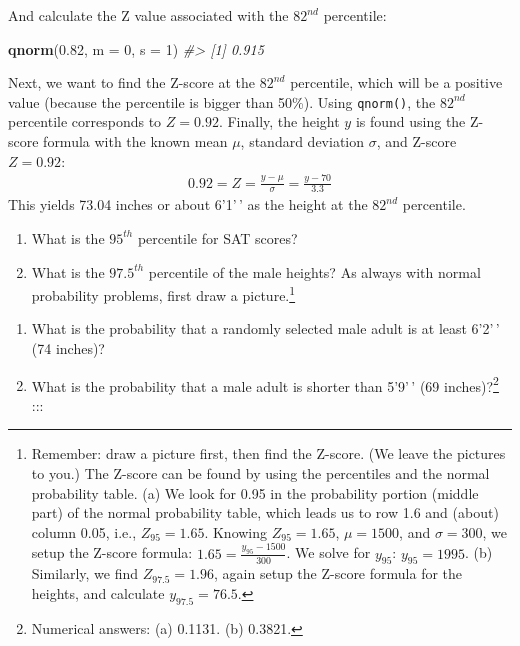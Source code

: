 \documentclass[
  10pt,
  openany]{book}
\newenvironment{Shaded}{\begin{snugshade}}{\end{snugshade}}
\newcommand{\AttributeTok}[1]{\textcolor[rgb]{0.13,0.29,0.53}{#1}}
\newcommand{\CommentTok}[1]{\textcolor[rgb]{0.56,0.35,0.01}{\textit{#1}}}
\newcommand{\DecValTok}[1]{\textcolor[rgb]{0.00,0.00,0.81}{#1}}
\newcommand{\FloatTok}[1]{\textcolor[rgb]{0.00,0.00,0.81}{#1}}
\newcommand{\FunctionTok}[1]{\textcolor[rgb]{0.13,0.29,0.53}{\textbf{#1}}}
\newcommand{\NormalTok}[1]{#1}
\providecommand{\tightlist}{%
  \setlength{\itemsep}{0pt}\setlength{\parskip}{0pt}}
\theoremstyle{definition}
\theoremstyle{definition}
\theoremstyle{definition}
\theoremstyle{definition}
\theoremstyle{remark}
\begin{document}
And calculate the Z value associated with the \(82^{nd}\) percentile:

\begin{Shaded}
\begin{Highlighting}[]
\FunctionTok{qnorm}\NormalTok{(}\FloatTok{0.82}\NormalTok{, }\AttributeTok{m =} \DecValTok{0}\NormalTok{, }\AttributeTok{s =} \DecValTok{1}\NormalTok{)}
\CommentTok{\#\textgreater{} [1] 0.915}
\end{Highlighting}
\end{Shaded}

Next, we want to find the Z-score at the \(82^{nd}\) percentile, which will be a positive value (because the percentile is bigger than 50\%).
Using \texttt{qnorm()}, the \(82^{nd}\) percentile corresponds to \(Z=0.92\). Finally, the height \(y\) is found using the Z-score formula with the known mean \(\mu\), standard deviation \(\sigma\), and Z-score \(Z=0.92\): \begin{eqnarray*}
0.92 = Z = \frac{y-\mu}{\sigma} = \frac{y - 70}{3.3}
\end{eqnarray*} This yields 73.04 inches or about 6'1'\,' as the height at the \(82^{nd}\) percentile.

\begin{enumerate}
\def\labelenumi{(\alph{enumi})}
\tightlist
\item
  What is the \(95^{th}\) percentile for SAT scores?\\
\item
  What is the \(97.5^{th}\) percentile of the male heights? As always with normal probability problems, first draw a picture.\footnote{Remember: draw a picture first, then find the Z-score. (We leave the pictures to you.) The Z-score can be found by using the percentiles and the normal probability table. (a) We look for 0.95 in the probability portion (middle part) of the normal probability table, which leads us to row 1.6 and (about) column 0.05, i.e., \(Z_{95}=1.65\). Knowing \(Z_{95}=1.65\), \(\mu = 1500\), and \(\sigma = 300\), we setup the Z-score formula: \(1.65 = \frac{y_{95} - 1500}{300}\). We solve for \(y_{95}\): \(y_{95} = 1995\). (b) Similarly, we find \(Z_{97.5} = 1.96\), again setup the Z-score formula for the heights, and calculate \(y_{97.5} = 76.5\).}
\end{enumerate}

\begin{enumerate}
\def\labelenumi{(\alph{enumi})}
\tightlist
\item
  What is the probability that a randomly selected male adult is at least 6'2'\,' (74 inches)?\\
\item
  What is the probability that a male adult is shorter than 5'9'\,' (69 inches)?\footnote{Numerical answers: (a) 0.1131.
    (b) 0.3821.}
  :::
\end{enumerate}
\end{document}
